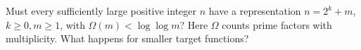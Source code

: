 Must every sufficiently large positive integer $n$ have a representation $n=2^k+m$, $k\ge0,m\ge1$, with $\Omega(m)<\log\log m$? Here $\Omega$ counts prime factors with multiplicity. What happens for smaller target functions?
